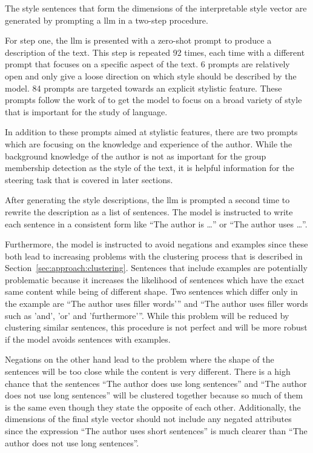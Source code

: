 The style sentences that form the dimensions of the interpretable style vector are generated by prompting a \acl{llm} in a two-step procedure.

For step one, the \ac{llm} is presented with a zero-shot prompt to produce a description of the text. This step is repeated 92 times, each time with a different prompt that focuses on a specific aspect of the text. 6 prompts are relatively open and only give a loose direction on which style should be described by the model. 84 prompts are targeted towards an explicit stylistic feature. These prompts follow the work of \citet{patelLearningInterpretableStyle2023,tausczikPsychologicalMeaningWords2010} to get the model to focus on a broad variety of style that is important for the study of language.

In addition to these prompts aimed at stylistic features, there are two prompts which are focusing on the knowledge and experience of the author. While the background knowledge of the author is not as important for the group membership detection as the style of the text, it is helpful information for the steering task that is covered in later sections.

After generating the style descriptions, the \ac{llm} is prompted a second time to rewrite the description as a list of sentences. The model is instructed to write each sentence in a consistent form like \enquote{The author is \ldots} or \enquote{The author uses \ldots}.

Furthermore, the model is instructed to avoid negations and examples since these both lead to increasing problems with the clustering process that is described in Section~\ref{sec:approach:clustering}.
Sentences that include examples are potentially problematic because it increases the likelihood of sentences which have the exact same content while being of different shape. %
Two sentences which differ only in the example are \enquote{The author uses filler words'} and \enquote{The author uses filler words such as 'and', 'or' and 'furthermore'}. While this problem will be reduced by clustering similar sentences, this procedure is not perfect and will be more robust if the model avoids sentences with examples.

Negations on the other hand lead to the problem where the shape of the sentences will be too close while the content is very different. There is a high chance that the sentences \enquote{The author does use long sentences} and \enquote{The author does not use long sentences} will be clustered together because so much of them is the same even though they state the opposite of each other.
Additionally, the dimensions of the final style vector should not include any negated attributes since the expression \enquote{The author uses short sentences} is much clearer than \enquote{The author does not use long sentences}.

